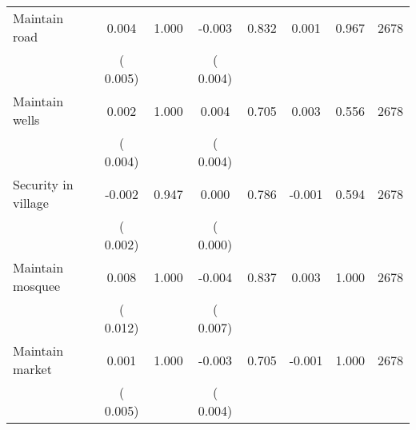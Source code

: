 \begin{tabular}{l*{7}{c}}
 Maintain road       &              0.004       &        1.000  &             -0.003       &        0.832  &              0.001       &              0.967 &  2678 \\ 
                       &       (       0.005)             &                               &       (       0.004)                     &                               &                                               &                                &                      \\ 

 Maintain wells       &              0.002       &        1.000  &              0.004       &        0.705  &              0.003       &              0.556 &  2678 \\ 
                       &       (       0.004)             &                               &       (       0.004)                     &                               &                                               &                                &                      \\ 

 Security in village       &             -0.002       &        0.947  &              0.000       &        0.786  &             -0.001       &              0.594 &  2678 \\ 
                       &       (       0.002)             &                               &       (       0.000)                     &                               &                                               &                                &                      \\ 

 Maintain mosquee       &              0.008       &        1.000  &             -0.004       &        0.837  &              0.003       &              1.000 &  2678 \\ 
                       &       (       0.012)             &                               &       (       0.007)                     &                               &                                               &                                &                      \\ 

 Maintain market       &              0.001       &        1.000  &             -0.003       &        0.705  &             -0.001       &              1.000 &  2678 \\ 
                       &       (       0.005)             &                               &       (       0.004)                     &                               &                                               &                                &                      \\ 


\end{tabular}
